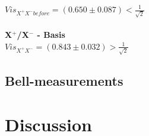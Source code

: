 \documentclass[12pt,a4paper]{article}
\begin{document}
\begin{multicols}{2}
$Vis_{X^+ X^- before}=(0.650 \pm 0.087) < \frac{1}{\sqrt{2}}$\\
\\
\textbf{X$^+$/X$^-$ - Basis}\\

$Vis_{X^+ X^- }=(0.843 \pm 0.032) > \frac{1}{\sqrt{2}}$\\

\subsection{Bell-measurements}




\section{Discussion}






\end{multicols}
\end{document}
